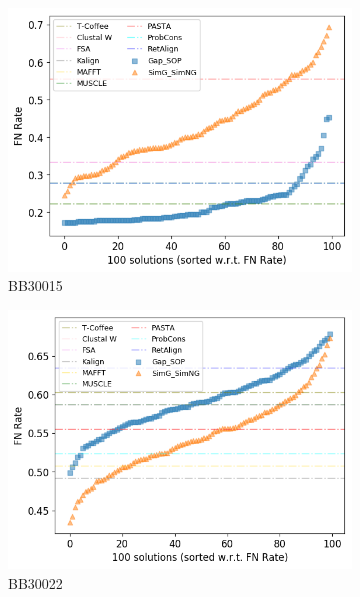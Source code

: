\begin{figure}[!htbp]
\begin{adjustwidth}{-1cm}{-1cm}
\begin{subfigure}{0.22\textwidth}
		\end{subfigure}
		\begin{subfigure}{0.22\textwidth}
			\includegraphics[width=\columnwidth]{Figure/summary/precomputedInit/Balibase/BB30015_fnrate_density_single_run}
			\caption{BB30015}
		\end{subfigure}
		\begin{subfigure}{0.22\textwidth}
			\includegraphics[width=\columnwidth]{Figure/summary/precomputedInit/Balibase/BB30022_fnrate_density_single_run}
			\caption{BB30022}
		\end{subfigure}
		\begin{subfigure}{0.22\textwidth}

\end{subfigure}
\end{adjustwidth}
\end{figure}

